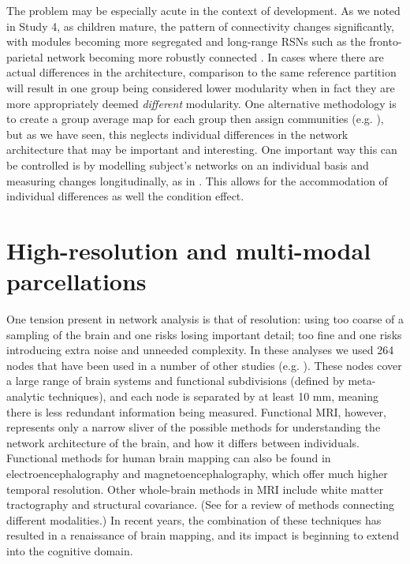 The problem may be especially acute in the context of development. As we noted in Study 4, as children mature, the pattern of connectivity changes significantly, with modules becoming more segregated and long-range RSNs such as the fronto-parietal network becoming more robustly connected \citep{Cao2016}. In cases where there are actual differences in the architecture, comparison to the same reference partition will result in one group being considered lower modularity when in fact they are more appropriately deemed \textit{different} modularity. One alternative methodology is to create a group average map for each group then assign communities (e.g. \citep{Chan2014}), but as we have seen, this neglects individual differences in the network architecture that may be important and interesting. One important way this can be controlled is by modelling subject's networks on an individual basis and measuring changes longitudinally, as in \citep{Bassett2015}. This allows for the accommodation of individual differences as well the condition effect.


\section{High-resolution and multi-modal parcellations}

One tension present in network analysis is that of resolution: using too coarse of a sampling of the brain and one risks losing important detail; too fine and one risks introducing extra noise and unneeded complexity. In these analyses we used 264 nodes that have been used in a number of other studies (e.g. \citep{Power2013, Cole2014}). These nodes cover a large range of brain systems and functional subdivisions (defined by meta-analytic techniques), and each node is separated by at least 10 mm, meaning there is less redundant information being measured. Functional MRI, however, represents only a narrow sliver of the possible methods for understanding the network architecture of the brain, and how it differs between individuals. Functional methods for human brain mapping can also be found in electroencephalography and magnetoencephalography, which offer much higher temporal resolution. Other whole-brain methods in MRI include white matter tractography and structural covariance. (See \citep{Sui2012} for a review of methods connecting different modalities.) In recent years, the combination of these techniques has resulted in a renaissance of brain mapping, and its impact is beginning to extend into the cognitive domain. 

